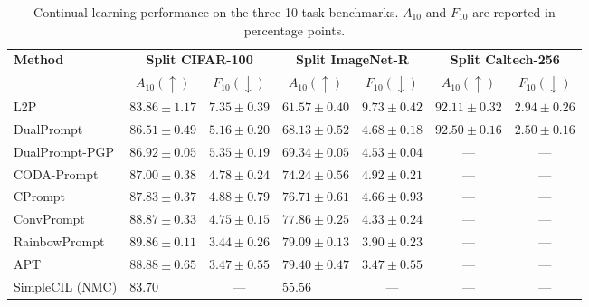 \begin{table}[htb]
	\centering
	\caption{Continual-learning performance on the three 10-task benchmarks. $A_{10}$ and $F_{10}$ are reported in percentage points.}
	\label{tab:combined_benchmarks}
	\scriptsize
	\begin{tabularx}{\textwidth}{lXXXXXX}
		\toprule
		\textbf{Method} & \multicolumn{2}{c}{\textbf{Split CIFAR-100}} & \multicolumn{2}{c}{\textbf{Split ImageNet-R}} & \multicolumn{2}{c}{\textbf{Split Caltech-256}} \\
		\cmidrule(lr){2-3} \cmidrule(lr){4-5} \cmidrule(lr){6-7}
		& \multicolumn{1}{c}{$A_{10} (\uparrow)$} & \multicolumn{1}{c}{$F_{10} (\downarrow)$} & \multicolumn{1}{c}{$A_{10} (\uparrow)$} & \multicolumn{1}{c}{$F_{10} (\downarrow)$} & \multicolumn{1}{c}{$A_{10} (\uparrow)$} & \multicolumn{1}{c}{$F_{10} (\downarrow)$} \\
		\midrule
		L2P             & $83.86 \pm 1.17$ & $7.35 \pm 0.39$ & $61.57 \pm 0.40$ & $9.73 \pm 0.42$ & $92.11 \pm 0.32$ & $2.94 \pm 0.26$ \\
		DualPrompt      & $86.51 \pm 0.49$ & $5.16 \pm 0.20$ & $68.13 \pm 0.52$ & $4.68 \pm 0.18$ & $92.50 \pm 0.16$ & $2.50 \pm 0.16$ \\
		DualPrompt-PGP  & $86.92 \pm 0.05$ & $5.35 \pm 0.19$ & $69.34 \pm 0.05$ & $4.53 \pm 0.04$ & \multicolumn{1}{c}{---} & \multicolumn{1}{c}{---} \\
		CODA-Prompt     & $87.00 \pm 0.38$ & $4.78 \pm 0.24$ & $74.24 \pm 0.56$ & $4.92 \pm 0.21$ & \multicolumn{1}{c}{---} & \multicolumn{1}{c}{---} \\
		CPrompt         & $87.83 \pm 0.37$ & $4.88 \pm 0.79$ & $76.71 \pm 0.61$ & $4.66 \pm 0.93$ & \multicolumn{1}{c}{---} & \multicolumn{1}{c}{---} \\
		ConvPrompt      & $88.87 \pm 0.33$ & $4.75 \pm 0.15$ & $77.86 \pm 0.25$ & $4.33 \pm 0.24$ & \multicolumn{1}{c}{---} & \multicolumn{1}{c}{---} \\
		RainbowPrompt   & $89.86 \pm 0.11$ & $3.44 \pm 0.26$ & $79.09 \pm 0.13$ & $3.90 \pm 0.23$ & \multicolumn{1}{c}{---} & \multicolumn{1}{c}{---} \\
		APT             & $88.88 \pm 0.65$ & $3.47 \pm 0.55$ & $79.40 \pm 0.47$ & $3.47 \pm 0.55$ & \multicolumn{1}{c}{---} & \multicolumn{1}{c}{---} \\
		\midrule
		SimpleCIL (NMC) \cite{janson2022simple} & $83.70$ & \multicolumn{1}{c}{---} & $55.56$ & \multicolumn{1}{c}{---} & \multicolumn{1}{c}{---} & \multicolumn{1}{c}{---} \\

\end{tabularx}
\end{table}
